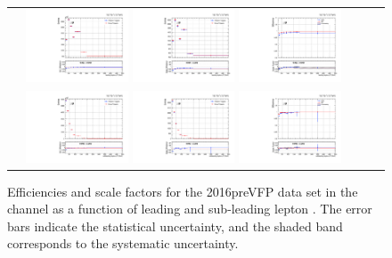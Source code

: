 \begin{figure}[htb]
  \begin{center}
    \begin{tabular}{ccc}
      \includegraphics[width=0.30\textwidth]{fig_2016preVFP_TrigSF/g_lepApt_mumu_MC.pdf}
      \includegraphics[width=0.30\textwidth]{fig_2016preVFP_TrigSF/g_lepApt_mumu_data.pdf}
      \includegraphics[width=0.30\textwidth]{fig_2016preVFP_TrigSF/g_mumu_lepApt_FullSystUncBand.pdf}\\
      \includegraphics[width=0.30\textwidth]{fig_2016preVFP_TrigSF/g_lepBpt_mumu_MC.pdf}
      \includegraphics[width=0.30\textwidth]{fig_2016preVFP_TrigSF/g_lepBpt_mumu_data.pdf}
      \includegraphics[width=0.30\textwidth]{fig_2016preVFP_TrigSF/g_mumu_lepBpt_FullSystUncBand.pdf}\\
    \end{tabular}
    \caption{Efficiencies and scale factors for the 2016preVFP data set in the \mumu channel as a function of leading and sub-leading lepton \pT.
            The error bars indicate the statistical uncertainty, and the shaded band corresponds to the systematic uncertainty.
            }
    \label{TrigSF_2016preVFP_3}
  \end{center}
\end{figure}

